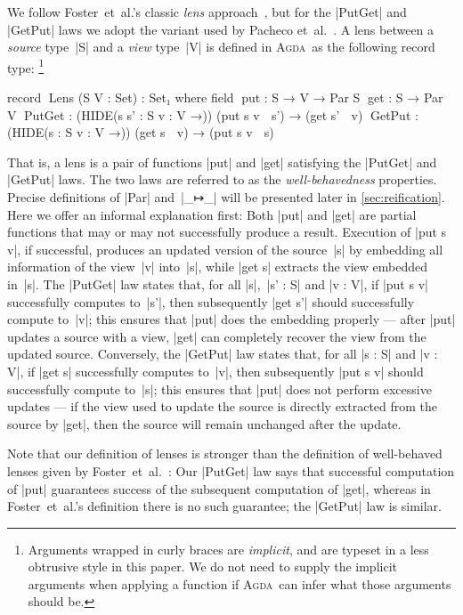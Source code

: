 \documentclass{sigplanconf}
\renewcommand{\emph}{\textsl}
\newcommand{\Agda}{\textsc{Agda}}
\begin{document}
We follow Foster~et~al.'s classic \emph{lens} approach~\cite{Foster-lenses}, but for the |PutGet| and |GetPut| laws we adopt the variant used by Pacheco et~al.~\cite{Pacheco-putlenses}.
A lens between a \emph{source} type~|S| and a \emph{view} type~|V| is defined in \Agda\ as the following record type:%
\footnote{Arguments wrapped in curly braces are \emph{implicit}, and are typeset in a less obtrusive style in this paper.
We do not need to supply the implicit arguments when applying a function if \Agda\ can infer what those arguments should be.}
\begin{code}
record ^^^Lens (S V : Set) : Set₁ where
  field
    ^^^put  : S → V → Par S
    ^^^get  : S → Par V
    ^^^PutGet  : (HIDE({s s' : S} {v : V} →))  (put s v ↦ s') → (get s' ↦ v)
    ^^^GetPut  : (HIDE({s : S} {v : V} →))     (get s ↦ v) → (put s v ↦ s)
\end{code}
That is, a lens is a pair of functions |put| and |get| satisfying the |PutGet| and |GetPut| laws.
The two laws are referred to as the \emph{well-behavedness} properties.
Precise definitions of |Par| and~|_↦_| will be presented later in \autoref{sec:reification}.
Here we offer an informal explanation first:
Both |put| and |get| are partial functions that may or may not successfully produce a result.
Execution of |put s v|, if successful, produces an updated version of the source~|s| by embedding all information of the view~|v| into~|s|, while |get s| extracts the view embedded in~|s|.
The |PutGet| law states that, for all |s|,~|s' : S| and |v : V|, if |put s v| successfully computes to~|s'|, then subsequently |get s'| should successfully compute to~|v|; this ensures that |put| does the embedding properly --- after |put| updates a source with a view, |get| can completely recover the view from the updated source.
Conversely, the |GetPut| law states that, for all |s : S| and |v : V|, if |get s| successfully computes to~|v|, then subsequently |put s v| should successfully compute to~|s|; this ensures that |put| does not perform excessive updates --- if the view used to update the source is directly extracted from the source by |get|, then the source will remain unchanged after the update.

Note that our definition of lenses is stronger than the definition of well-behaved lenses given by Foster~et~al.~\cite[Definition~3.2]{Foster-lenses}: Our |PutGet| law says that successful computation of |put| guarantees success of the subsequent computation of |get|, whereas in Foster~et~al.'s definition there is no such guarantee; the |GetPut| law is similar.
\end{document}
